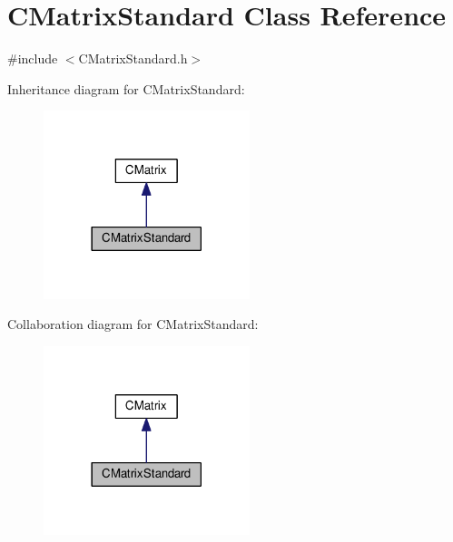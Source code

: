 \hypertarget{classCMatrixStandard}{}\section{C\+Matrix\+Standard Class Reference}
\label{classCMatrixStandard}


{\ttfamily \#include $<$C\+Matrix\+Standard.\+h$>$}



Inheritance diagram for C\+Matrix\+Standard\+:\nopagebreak
\begin{figure}[H]
\begin{center}
\leavevmode
\includegraphics[width=170pt]{classCMatrixStandard__inherit__graph}
\end{center}
\end{figure}


Collaboration diagram for C\+Matrix\+Standard\+:\nopagebreak
\begin{figure}[H]
\begin{center}
\leavevmode
\includegraphics[width=170pt]{classCMatrixStandard__coll__graph}
\end{center}
\end{figure}
